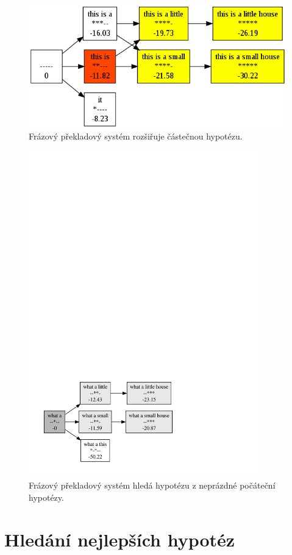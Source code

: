 \documentclass[12pt,a4paper]{report}
\begin{document}
\begin{figure}[t]
\centerline{\mbox{\includegraphics[width=120mm]{pictures/lattice-selected}}}
\caption{Frázový překladový systém rozšiřuje částečnou hypotézu.}
\label{lattice-selected}
\end{figure}

\begin{figure}[t]
\centerline{\mbox{\includegraphics[width=100mm]{pictures/non-zero-start}}}
\caption{Frázový překladový systém hledá hypotézu z neprázdné počáteční hypotézy.}
\label{non-zero-start}
\end{figure}

\section{Hledání nejlepších hypotéz}
\end{document}
